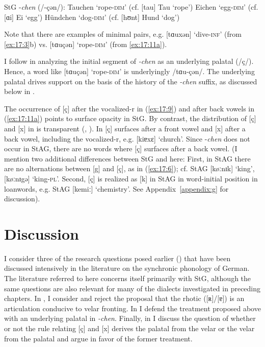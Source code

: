 \ea%
\label{ex:17:11}StG -\textit{chen} (/-çən/):
\ea\relax [tɑuçən]  \tab  Tauchen   \tab ‘rope\textsc{{}-dim}’  (cf. [tau] Tau ‘rope’)\label{ex:17:11a}
\ex\relax [ɑiçən]   \tab   Eichen   \tab ‘egg\textsc{{}-dim}’  (cf. [ɑi] Ei ‘egg’)\label{ex:17:11b}
\ex\relax [hʏntçən] \tab   Hündchen \tab ‘dog\textsc{{}-dim}’  (cf. [hʊnt] Hund ‘dog’)\label{ex:17:11c}
\z
\z 

Note that there are examples of minimal pairs, e.g. [tɑuxən] ‘dive-\textsc{inf}’ (from \ref{ex:17:3}b) vs. [tɑuçən] ‘rope-\textsc{dim}’ (from \ref{ex:17:11a}).

I follow \citet{Robinson2001} in analyzing the initial segment of \textit{-chen} as an underlying palatal (/ç/). Hence, a word like [tɑuçən] ‘rope\textsc{{}-dim}’ is underlyingly /tɑu-çən/. The underlying palatal drives support on the basis of the history of the \textit{-chen} suffix, as discussed below in .

The occurrence of [ç] after the vocalized-r in (\ref{ex:17:9}) and after back vowels in (\ref{ex:17:11a}) points to surface opacity in StG. By contrast, the distribution of [ç] and [x] in  is transparent (\citealt{hildenbrandt2013}, \citealt{MoosmüllerBrandstätter2015}). In  [ç] surfaces after a front vowel and [x] after a back vowel, including the vocalized-r, e.g. [kiɐxɛ] ‘church’. Since -\textit{chen} does not occur in StAG, there are no words where [ç] surfaces after a back vowel. (I mention two additional differences between StG and  here: First, in StAG there are no alternations between [g] and [ç], as in (\ref{ex:17:6}); cf. StAG [køːnɪk] ‘king’, [køːnɪgə] ‘king-\textsc{pl}’. Second, [ç] is realized as [k] in StAG in word-initial position in loanwords, e.g. StAG [kemiː] ‘chemistry’. See Appendix~\ref{appendix:g} for discussion). 

\section{{Discussion}}\label{sec:17.3}

I consider three of the research questions posed earlier () that have been discussed intensively in the literature on the synchronic phonology of German. The literature referred to here concerns itself primarily with StG, although the same questions are also relevant for many of the dialects investigated in preceding chapters. In , I consider and reject the proposal that the rhotic ([ʀ]/[ɐ]) is an articulation conducive to velar fronting. In  I defend the treatment proposed above with an underlying palatal in \textit{-chen}. Finally, in  I discuss the question of whether or not the rule relating [ç] and [x] derives the palatal from the velar or the velar from the palatal and argue in favor of the former treatment.

